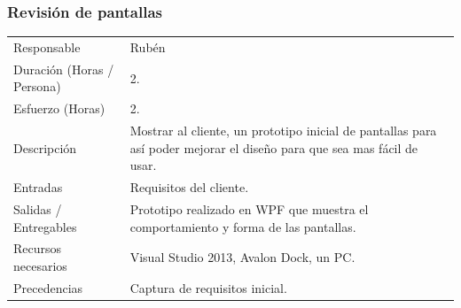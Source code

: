 \subsubsection{Revisi\'{o}n de pantallas}
\begin{table}[H]
    \begin{center}
        \begin{tabular}{l p{8cm}}
            Responsable                           & Rub\'{e}n \\
            Duraci\'{o}n (Horas / Persona)        & 2. \\ 
            Esfuerzo (Horas)                      & 2. \\
            Descripci\'{o}n                       & Mostrar al cliente, un prototipo inicial de pantallas
                                                    para as\'i poder mejorar el dise\~{n}o para que sea mas f\'{a}cil de usar. \\
            Entradas                              & Requisitos del cliente. \\
            Salidas / Entregables                 & Prototipo realizado en WPF que muestra el comportamiento y forma de las pantallas. \\
            Recursos necesarios                   & Visual Studio 2013, Avalon Dock, un PC. \\
            Precedencias                          & Captura de requisitos inicial. \\
        \end{tabular}
    \end{center}
    
\end{table}

